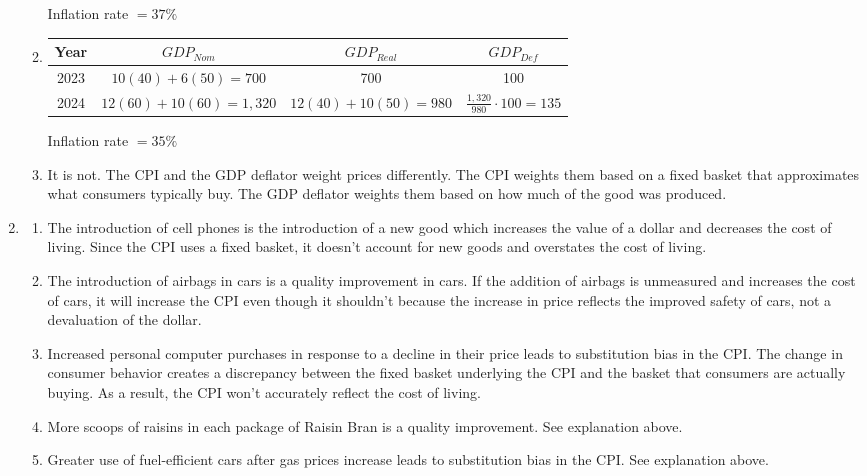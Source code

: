 \documentclass{article}
\begin{document}
\begin{enumerate}
\begin{enumerate}
		Inflation rate $= 37\%$
		
	\item \phantom{x}
	
		\begin{center}
		\begin{tabular}{| c | c | c | c |}
		\hline
		Year & $GDP_{Nom}$ & $GDP_{Real}$ & $GDP_{Def}$ \\
		\hline
		2023 & $10(40) + 6(50) = 700$ & 700 & 100 \\
		\hline
		2024 & $12(60) + 10(60) = 1,320$ & $12(40) + 10(50) = 980$ & $\frac{1,320}{980} \cdot 100 = 135$ \\
		\hline
		\end{tabular}
		\end{center}
		
		Inflation rate $= 35\%$
		
	\item It is not. The CPI and the GDP deflator weight prices differently. The CPI weights them based on a fixed basket that approximates what consumers typically buy. The GDP deflator weights them based on how much of the good was produced.
	
	\end{enumerate}
	
\item

	\begin{enumerate}
	
	\item The introduction of cell phones is the introduction of a new good which increases the value of a dollar and decreases the cost of living. Since the CPI uses a fixed basket, it doesn't account for new goods and overstates the cost of living.
	
	\item The introduction of airbags in cars is a quality improvement in cars. If the addition of airbags is unmeasured and increases the cost of cars, it will increase the CPI even though it shouldn't because the increase in price reflects the improved safety of cars, not a devaluation of the dollar.
	
	\item Increased personal computer purchases in response to a decline in their price leads to substitution bias in the CPI. The change in consumer behavior creates a discrepancy between the fixed basket underlying the CPI and the basket that consumers are actually buying. As a result, the CPI won't accurately reflect the cost of living. 
	
	\item More scoops of raisins in each package of Raisin Bran is a quality improvement. See explanation above.
	
	\item Greater use of fuel-efficient cars after gas prices increase leads to substitution bias in the CPI. See explanation above. 
	
	\end{enumerate}
			
\end{enumerate}
\end{document}
